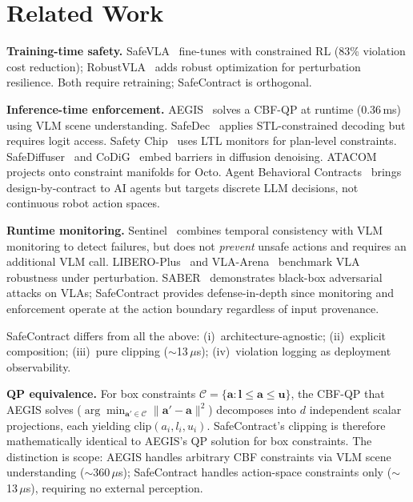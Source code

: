 \documentclass[conference]{IEEEtran}
\begin{document}
\section{Related Work}

\textbf{Training-time safety.}
SafeVLA~\cite{safevla} fine-tunes with constrained RL (83\% violation cost reduction); RobustVLA~\cite{robustvla} adds robust optimization for perturbation resilience. Both require retraining; SafeContract is orthogonal.

\textbf{Inference-time enforcement.}
AEGIS~\cite{aegis} solves a CBF-QP at runtime (0.36\,ms) using VLM scene understanding.
SafeDec~\cite{safedec} applies STL-constrained decoding but requires logit access.
Safety Chip~\cite{safetychip} uses LTL monitors for plan-level constraints.
SafeDiffuser~\cite{safediffuser} and CoDiG~\cite{codig} embed barriers in diffusion denoising.
ATACOM~\cite{atacom} projects onto constraint manifolds for Octo.
Agent Behavioral Contracts~\cite{abc} brings design-by-contract to AI agents but targets discrete LLM decisions, not continuous robot action spaces.

\textbf{Runtime monitoring.}
Sentinel~\cite{sentinel} combines temporal consistency with VLM monitoring to detect failures, but does not \emph{prevent} unsafe actions and requires an additional VLM call.
LIBERO-Plus~\cite{liberoplus} and VLA-Arena~\cite{vlaarena} benchmark VLA robustness under perturbation.
SABER~\cite{saber} demonstrates black-box adversarial attacks on VLAs; SafeContract provides defense-in-depth since monitoring and enforcement operate at the action boundary regardless of input provenance.

SafeContract differs from all the above: (i)~architecture-agnostic; (ii)~explicit composition; (iii)~pure clipping (${\sim}$13\,$\mu$s); (iv)~violation logging as deployment observability.

\textbf{QP equivalence.}
For box constraints $\mathcal{C} = \{\mathbf{a} : \mathbf{l} \leq \mathbf{a} \leq \mathbf{u}\}$, the CBF-QP that AEGIS solves ($\arg\min_{\mathbf{a}' \in \mathcal{C}} \|\mathbf{a}' - \mathbf{a}\|^2$) decomposes into $d$ independent scalar projections, each yielding $\text{clip}(a_i, l_i, u_i)$.
SafeContract's clipping is therefore mathematically identical to AEGIS's QP solution for box constraints.
The distinction is scope: AEGIS handles arbitrary CBF constraints via VLM scene understanding (${\sim}$360\,$\mu$s); SafeContract handles action-space constraints only (${\sim}$13\,$\mu$s), requiring no external perception.
\end{document}
